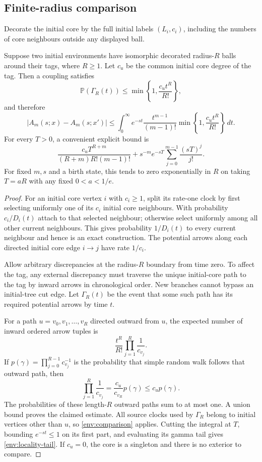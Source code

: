 \subsection{Finite-radius comparison}

Decorate the initial core by the full initial labels $(L_i,c_i)$,
including the numbers of core neighbours outside any displayed ball.

\begin{theorem}\label{env:locality}
Suppose two initial environments have isomorphic decorated radius-$R$
balls around their tags, where $R\ge1$. Let $c_u$ be the common initial
core degree of the tag. Then a coupling satisfies
\[
 \mathbb P(\Gamma_R(t))
 \le\min\left\{1,\frac{c_u t^R}{R!}\right\},
\]
and therefore
\begin{equation}\label{env:locality-integral}
 |A_m(s;x)-A_m(s;x')|
 \le
 \int_0^\infty e^{-st}\frac{t^{m-1}}{(m-1)!}
 \min\left\{1,\frac{c_u t^R}{R!}\right\}\,dt .
\end{equation}
For every $T>0$, a convenient explicit bound is
\begin{equation}\label{env:locality-tail}
 \frac{c_u T^{R+m}}{(R+m)R!(m-1)!}
 +s^{-m}e^{-sT}\sum_{j=0}^{m-1}\frac{(sT)^j}{j!}.
\end{equation}
For fixed $m,s$ and a birth state, this tends to zero exponentially in
$R$ on taking $T=aR$ with any fixed $0<a<1/e$.
\end{theorem}
\begin{proof}
For an initial core vertex $i$ with $c_i\ge1$, split its rate-one clock
by first selecting uniformly one of its $c_i$ initial core neighbours.
With probability $c_i/D_i(t)$ attach to that selected neighbour;
otherwise select uniformly among all other current neighbours.
This gives probability $1/D_i(t)$ to every current neighbour and hence
is an exact construction. The potential arrows along each directed
initial core edge $i\to j$ have rate $1/c_i$.

Allow arbitrary discrepancies at the radius-$R$ boundary from time zero.
To affect the tag, any external discrepancy must traverse the unique
initial-core path to the tag by inward arrows in chronological order.
New branches cannot bypass an initial-tree cut edge. Let $\Gamma_R(t)$
be the event that some such path has its required potential arrows
by time $t$.

For a path $u=v_0,v_1,\ldots,v_R$ directed outward from $u$, the expected
number of inward ordered arrow tuples is
\[
 \frac{t^R}{R!}\prod_{j=1}^{R}\frac1{c_{v_j}}.
\]
If $p(\gamma)=\prod_{j=0}^{R-1}c_{v_j}^{-1}$ is the probability that
simple random walk follows that outward path, then
\[
 \prod_{j=1}^{R}\frac1{c_{v_j}}
 =\frac{c_u}{c_{v_R}}p(\gamma)\le c_u p(\gamma).
\]
The probabilities of these length-$R$ outward paths sum to at most one.
A union bound proves the claimed estimate. All source clocks used by
$\Gamma_R$ belong to initial vertices other than $u$, so
\eqref{env:comparison} applies. Cutting the integral at $T$, bounding
$e^{-st}\le1$ on its first part, and evaluating its gamma tail gives
\eqref{env:locality-tail}.
If $c_u=0$, the core is a singleton and there is no exterior to compare.
\end{proof}

